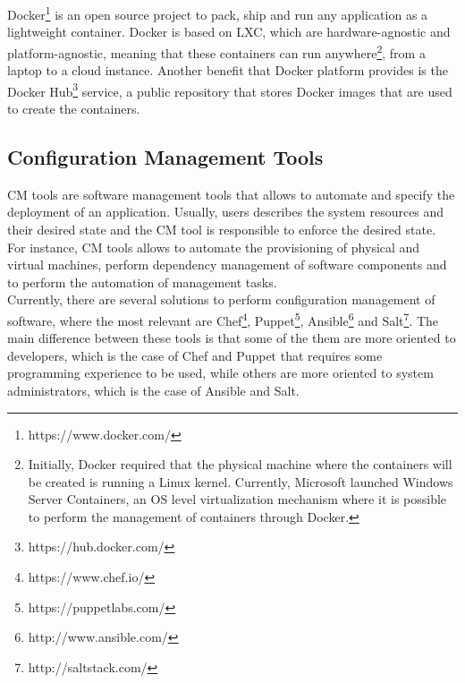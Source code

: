 Docker\footnote{https://www.docker.com/} is an open source project to pack, ship and run any application as
a lightweight container. Docker is based on \gls{LXC}, which are hardware-agnostic and platform-agnostic,
meaning that these containers can run anywhere\footnote{Initially, Docker required that the physical
machine where the containers will be created is running a Linux kernel. Currently, Microsoft
launched Windows Server Containers, an \gls{OS} level virtualization mechanism where it is possible to
perform the management of containers through Docker.}, from a laptop to a cloud instance. Another
benefit that Docker platform provides is the Docker Hub\footnote{https://hub.docker.com/} service,
a public repository that stores Docker images that are used to create the containers.

\subsection{Configuration Management Tools}
\label{sub:cm_tools}
\gls{CM} tools are software management tools that allows to automate and specify the deployment of an
application. Usually, users describes the system resources and their desired state and the \gls{CM}
tool is responsible to enforce the desired state. For instance, \gls{CM} tools allows to automate the
provisioning of physical and virtual machines, perform dependency management of software components
and to perform the automation of management tasks.\\

Currently, there are several solutions to perform configuration management of software, where the
most relevant are Chef\footnote{https://www.chef.io/}, Puppet\footnote{https://puppetlabs.com/},
Ansible\footnote{http://www.ansible.com/} and Salt\footnote{http://saltstack.com/}. The main difference
between these tools is that some of the them are more oriented to developers, which is the case of Chef and
Puppet that requires some programming experience to be used, while others are more oriented to system
administrators, which is the case of Ansible and Salt.
